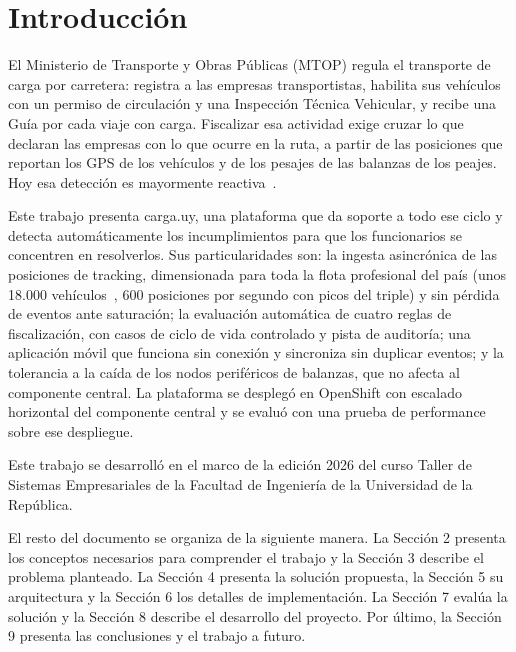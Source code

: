 \section{Introducción}

El Ministerio de Transporte y Obras Públicas (MTOP) regula el transporte de carga por carretera: registra a las empresas transportistas, habilita sus vehículos con un permiso de circulación y una Inspección Técnica Vehicular, y recibe una Guía por cada viaje con carga. Fiscalizar esa actividad exige cruzar lo que declaran las empresas con lo que ocurre en la ruta, a partir de las posiciones que reportan los GPS de los vehículos y de los pesajes de las balanzas de los peajes. Hoy esa detección es mayormente reactiva~\cite{LetraTSE2026}.

Este trabajo presenta carga.uy, una plataforma que da soporte a todo ese ciclo y detecta automáticamente los incumplimientos para que los funcionarios se concentren en resolverlos. Sus particularidades son: la ingesta asincrónica de las posiciones de tracking, dimensionada para toda la flota profesional del país (unos 18.000 vehículos~\cite{BID2022}, 600 posiciones por segundo con picos del triple) y sin pérdida de eventos ante saturación; la evaluación automática de cuatro reglas de fiscalización, con casos de ciclo de vida controlado y pista de auditoría; una aplicación móvil que funciona sin conexión y sincroniza sin duplicar eventos; y la tolerancia a la caída de los nodos periféricos de balanzas, que no afecta al componente central. La plataforma se desplegó en OpenShift con escalado horizontal del componente central y se evaluó con una prueba de performance sobre ese despliegue.

Este trabajo se desarrolló en el marco de la edición 2026 del curso Taller de Sistemas Empresariales de la Facultad de Ingeniería de la Universidad de la República.

El resto del documento se organiza de la siguiente manera. La Sección 2 presenta los conceptos necesarios para comprender el trabajo y la Sección 3 describe el problema planteado. La Sección 4 presenta la solución propuesta, la Sección 5 su arquitectura y la Sección 6 los detalles de implementación. La Sección 7 evalúa la solución y la Sección 8 describe el desarrollo del proyecto. Por último, la Sección 9 presenta las conclusiones y el trabajo a futuro.
